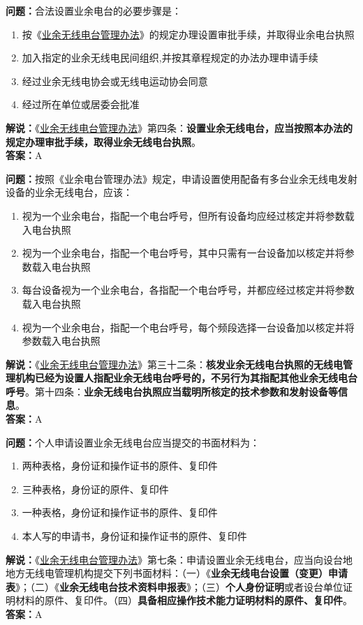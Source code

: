 \textbf{问题：}合法设置业余电台的必要步骤是：
\begin{enumerate}[label=\Alph*), leftmargin=1cm]
	\item 按《\href{https://www.miit.gov.cn/jgsj/zfs/bmgz/art/2020/art_147b69815b3641caad9047735f94c860.html}{业余无线电台管理办法}》的规定办理设置审批手续，并取得业余电台执照
	\item 加入指定的业余无线电民间组织,并按其章程规定的办法办理申请手续
	\item 经过业余无线电协会或无线电运动协会同意
	\item 经过所在单位或居委会批准
\end{enumerate}
\textbf{解说：}《\href{https://www.miit.gov.cn/jgsj/zfs/bmgz/art/2020/art_147b69815b3641caad9047735f94c860.html}{业余无线电台管理办法}》第四条：\textbf{设置业余无线电台，应当按照本办法的规定办理审批手续，取得业余无线电台执照}。\\\textbf{答案：}A

\textbf{问题：}按照《业余电台管理办法》规定，申请设置使用配备有多台业余无线电发射设备的业余无线电台，应该：
\begin{enumerate}[label=\Alph*), leftmargin=1cm]
	\item 视为一个业余电台，指配一个电台呼号，但所有设备均应经过核定并将参数载入电台执照
	\item 视为一个业余电台，指配一个电台呼号，其中只需有一台设备加以核定并将参数载入电台执照
	\item 每台设备视为一个业余电台，各指配一个电台呼号，并都应经过核定并将参数载入电台执照
	\item 视为一个业余电台，指配一个电台呼号，每个频段选择一台设备加以核定并将参数载入电台执照
\end{enumerate}
\textbf{解说：}《\href{https://www.miit.gov.cn/jgsj/zfs/bmgz/art/2020/art_147b69815b3641caad9047735f94c860.html}{业余无线电台管理办法}》第三十二条：\textbf{核发业余无线电台执照的无线电管理机构已经为设置人指配业余无线电台呼号的，不另行为其指配其他业余无线电台呼号}。第十四条：\textbf{业余无线电台执照应当载明所核定的技术参数和发射设备等信息}。\\\textbf{答案：}A

\textbf{问题：}个人申请设置业余无线电台应当提交的书面材料为：
\begin{enumerate}[label=\Alph*), leftmargin=1cm]
	\item 两种表格，身份证和操作证书的原件、复印件
	\item 三种表格，身份证的原件、复印件
	\item 一种表格，身份证和操作证书的原件、复印件
	\item 本人写的申请书，身份证和操作证书的原件、复印件
\end{enumerate}
\textbf{解说：}《\href{https://www.miit.gov.cn/jgsj/zfs/bmgz/art/2020/art_147b69815b3641caad9047735f94c860.html}{业余无线电台管理办法}》第七条：申请设置业余无线电台，应当向设台地地方无线电管理机构提交下列书面材料：（一）《\textbf{业余无线电台设置（变更）申请表}》；（二）《\textbf{业余无线电台技术资料申报表}》；（三）\textbf{个人身份证明}或者设台单位证明材料的原件、复印件。（四）\textbf{具备相应操作技术能力证明材料的原件、复印件}。\\\textbf{答案：}A

